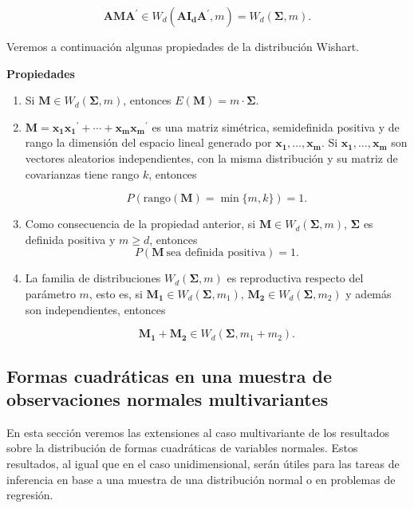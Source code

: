\documentclass[
  a4paper,
  oneside]{scrbook}
\theoremstyle{definition}
\theoremstyle{definition}
\theoremstyle{definition}
\theoremstyle{definition}
\theoremstyle{remark}
\begin{document}
\[\bm{A}\bm{M}\bm{A}^{\prime}\in W_d\left(\bm{A}\bm{I_d}\bm{A}^{\prime},m\right)=W_d\left(\bm\Sigma,m\right).\]

Veremos a continuación algunas propiedades de la distribución Wishart.

\textbf{Propiedades}

\begin{enumerate}
\def\labelenumi{\arabic{enumi}.}
\item
  Si \(\bm{M}\in W_d(\bm\Sigma,m)\), entonces
  \(E(\bm{M})=m\cdot\bm\Sigma\).
\item
  \(\bm{M}=\bm{x_1}\bm{x_1}^\prime{}+\cdots+\bm{x_m}\bm{x_m}^\prime{}\)
  es una matriz simétrica, semidefinida positiva y de rango la
  dimensión del espacio lineal generado por
  \(\bm{x_1},\ldots,\bm{x_m}\). Si \(\bm{x_1},\ldots,\bm{x_m}\) son
  vectores aleatorios independientes, con la misma distribución y su
  matriz de covarianzas tiene rango \(k\), entonces

  \[P(\mbox{rango}(\bm{M})=\min\{m,k\})=1.\]
\item
  Como consecuencia de la propiedad anterior, si
  \(\bm{M}\in W_d(\bm\Sigma,m)\), \(\bm\Sigma\) es definida positiva y
  \(m\geq d\), entonces \[P(\bm{M}\ \mbox{sea definida positiva})=1.\]
\item
  La familia de distribuciones \(W_d(\bm\Sigma,m)\) es reproductiva
  respecto del parámetro \(m\), esto es, si
  \(\bm{M_1}\in W_d(\bm\Sigma,m_1)\), \(\bm{M_2}\in W_d(\bm\Sigma,m_2)\) y
  además son independientes, entonces

  \[\bm{M_1}+\bm{M_2}\in W_d(\bm\Sigma,m_1+m_2).\]
\end{enumerate}

\subsection{Formas cuadráticas en una muestra de observaciones normales multivariantes}\label{formas-cuadraticas-en-una-muestra-de-observaciones-normales-multivariantes}

En esta sección veremos las extensiones al caso multivariante de los
resultados sobre la distribución de formas cuadráticas de variables
normales. Estos resultados, al igual que en el caso unidimensional,
serán útiles para las tareas de inferencia en base a una muestra de una
distribución normal o en problemas de regresión.
\end{document}
